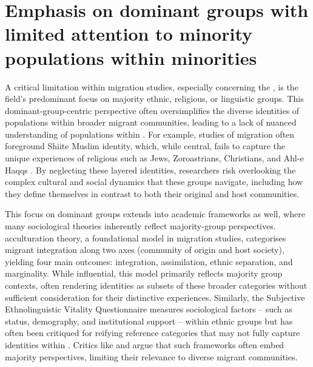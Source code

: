 \documentclass[output=paper,colorlinks,citecolor=brown]{langscibook}
\begin{document}
\section{Emphasis on dominant groups with limited attention to minority populations within minorities}\label{Intro.ss.2}
\largerpage
A critical limitation within migration studies, especially concerning the , is the field's predominant focus on majority ethnic, religious, or linguistic groups. This dominant-group-centric perspective often oversimplifies the diverse identities of  populations within broader migrant communities, leading to a lack of nuanced understanding of  populations within . For example, studies of  migration often foreground Shiite Muslim identity, which, while central, fails to capture the unique experiences of religious  such as Jews, Zoroastrians, Christians, and Ahl-e Haqqs \citep{gholami2023}. By neglecting these layered  identities, researchers risk overlooking the complex cultural and social dynamics that these groups navigate, including how they define themselves in contrast to both their original and host communities.

This focus on dominant groups extends into academic frameworks as well, where many sociological theories inherently reflect majority-group perspectives.  acculturation theory, a foundational model in migration studies, categorises migrant integration along two axes (community of origin and host society), yielding four main outcomes: integration, assimilation, ethnic separation, and marginality. While influential, this model primarily reflects majority group contexts, often rendering  identities as subsets of these broader categories without sufficient consideration for their distinctive experiences. Similarly, the Subjective Ethnolinguistic Vitality Questionnaire \citep{bourhis_giles_rosenthal1981} measures sociological factors -- such as status, demography, and institutional support -- within ethnic groups but has often been critiqued for reifying reference categories that may not fully capture  identities within . Critics like \citet{husband_khan1982} and \citet{tollefson1991} argue that such frameworks often embed majority perspectives, limiting their relevance to diverse migrant communities.
\end{document}
